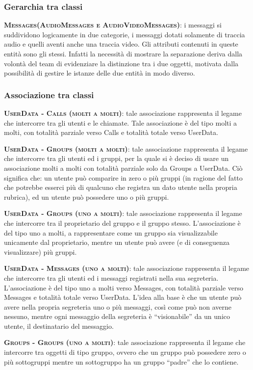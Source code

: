 \subsubsection{Gerarchia tra classi}

\begin{description}
	\item{\scshape\bfseries Messages(AudioMessages e AudioVideoMessages)}: i messaggi si suddividono logicamente in due categorie, i messaggi dotati solamente di traccia audio e quelli aventi anche una traccia video. Gli attributi contenuti in queste entità sono gli stessi. Infatti la necessità di mostrare la separazione deriva dalla volontà del team di evidenziare la distinzione tra i due oggetti, motivata dalla possibilità di gestire le istanze delle due entità in modo diverso.
\end{description}

\subsubsection{Associazione tra classi}

\begin{description}
	\item{\scshape\bfseries UserData - Calls (molti a molti)}: tale associazione rappresenta il legame che intercorre tra gli utenti e le chiamate. Tale associazione è del tipo molti a molti, con totalità parziale verso Calls e totalità totale verso UserData.
	\item{\scshape\bfseries UserData - Groups (molti a molti)}: tale associazione rappresenta il legame che intercorre tra gli utenti ed i gruppi, per la quale si è deciso di usare un associazione molti a molti con totalità parziale solo da Groups a UserData. Ciò significa che: un utente può comparire in zero o più gruppi (in ragione del fatto che potrebbe esserci più di qualcuno che registra un dato utente nella propria rubrica), ed un utente può possedere uno o più gruppi.
	\item{\scshape\bfseries UserData - Groups (uno a molti)}: tale associazione rappresenta il legame che intercorre tra il proprietario del gruppo e il gruppo stesso. L'associazione è del tipo uno a molti, a rappresentare come un gruppo sia visualizzabile unicamente dal proprietario, mentre un utente può avere (e di conseguenza visualizzare) più gruppi.
	\item{\scshape\bfseries UserData - Messages (uno a molti)}: tale associazione rappresenta il legame che intercorre tra gli utenti ed i messaggi registrati nella sua segreteria. L'associazione è del tipo uno a molti verso Messages, con totalità parziale verso Messages e totalità totale verso UserData. L'idea alla base è che un utente può avere nella propria segreteria uno o più messaggi, così come può non averne nessuno, mentre ogni messaggio della segreteria è ``visionabile'' da un unico utente, il destinatario del messaggio.
	\item{\scshape\bfseries Groups - Groups (uno a molti)}: tale associazione rappresenta il legame che intercorre tra oggetti di tipo gruppo, ovvero che un gruppo può possedere zero o più sottogruppi mentre un sottogruppo ha un gruppo ``padre'' che lo contiene.
\end{description}

